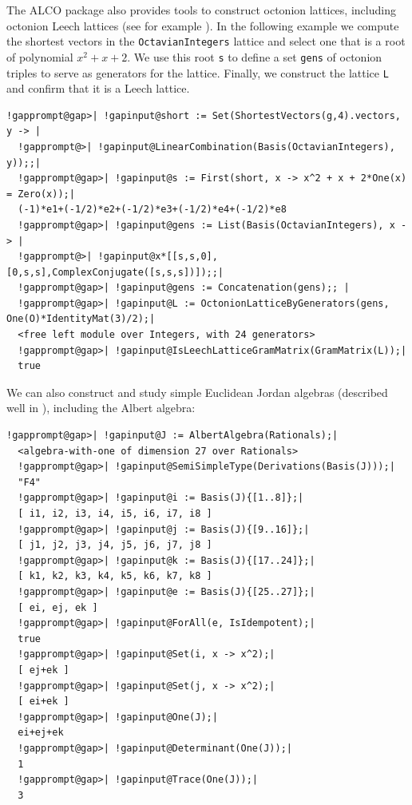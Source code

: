 \documentclass[a4paper,11pt]{report}
\begin{document}
{ The \textsf{ALCO} package also provides tools to construct octonion lattices, including octonion
Leech lattices (see for example \cite{wilson_octonions_2009}). In the following example we compute the shortest vectors in the \texttt{OctavianIntegers} lattice and select one that is a root of polynomial $x^2 + x + 2$. We use this root \texttt{s} to define a set \texttt{gens} of octonion triples to serve as generators for the lattice. Finally, we
construct the lattice \texttt{L} and confirm that it is a Leech lattice. 
\begin{Verbatim}[commandchars=!@|,fontsize=\small,frame=single,label=Example]
  !gapprompt@gap>| !gapinput@short := Set(ShortestVectors(g,4).vectors, y -> |
  !gapprompt@>| !gapinput@LinearCombination(Basis(OctavianIntegers), y));;|
  !gapprompt@gap>| !gapinput@s := First(short, x -> x^2 + x + 2*One(x) = Zero(x));|
  (-1)*e1+(-1/2)*e2+(-1/2)*e3+(-1/2)*e4+(-1/2)*e8
  !gapprompt@gap>| !gapinput@gens := List(Basis(OctavianIntegers), x -> |
  !gapprompt@>| !gapinput@x*[[s,s,0],[0,s,s],ComplexConjugate([s,s,s])]);;|
  !gapprompt@gap>| !gapinput@gens := Concatenation(gens);; |
  !gapprompt@gap>| !gapinput@L := OctonionLatticeByGenerators(gens, One(O)*IdentityMat(3)/2);|
  <free left module over Integers, with 24 generators>
  !gapprompt@gap>| !gapinput@IsLeechLatticeGramMatrix(GramMatrix(L));|
  true
\end{Verbatim}
 We can also construct and study simple Euclidean Jordan algebras (described
well in \cite{faraut_analysis_1994}), including the Albert algebra: 
\begin{Verbatim}[commandchars=!@|,fontsize=\small,frame=single,label=Example]
  !gapprompt@gap>| !gapinput@J := AlbertAlgebra(Rationals);|
  <algebra-with-one of dimension 27 over Rationals>
  !gapprompt@gap>| !gapinput@SemiSimpleType(Derivations(Basis(J)));|
  "F4"
  !gapprompt@gap>| !gapinput@i := Basis(J){[1..8]};|
  [ i1, i2, i3, i4, i5, i6, i7, i8 ]
  !gapprompt@gap>| !gapinput@j := Basis(J){[9..16]};|
  [ j1, j2, j3, j4, j5, j6, j7, j8 ]
  !gapprompt@gap>| !gapinput@k := Basis(J){[17..24]};|
  [ k1, k2, k3, k4, k5, k6, k7, k8 ]
  !gapprompt@gap>| !gapinput@e := Basis(J){[25..27]};|
  [ ei, ej, ek ]
  !gapprompt@gap>| !gapinput@ForAll(e, IsIdempotent);|
  true
  !gapprompt@gap>| !gapinput@Set(i, x -> x^2);|
  [ ej+ek ]
  !gapprompt@gap>| !gapinput@Set(j, x -> x^2);|
  [ ei+ek ]
  !gapprompt@gap>| !gapinput@One(J);|
  ei+ej+ek
  !gapprompt@gap>| !gapinput@Determinant(One(J));|
  1
  !gapprompt@gap>| !gapinput@Trace(One(J));|
  3
\end{Verbatim}
 }
\end{document}
